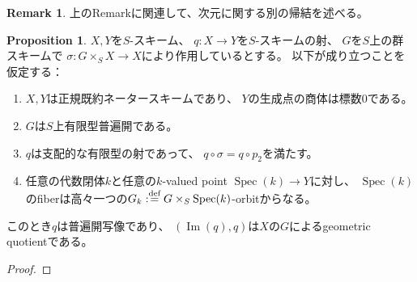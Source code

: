 \documentclass[uplatex]{jsarticle}
\theoremstyle{definition}
\newtheorem{prop}[prop]{Proposition}
\newtheorem*{rem*}{Remark}
\DeclareMathOperator{\im}{\mathrm{Im}}
\DeclareMathOperator{\Spec}{\mathrm{Spec}}
\newcommand{\dfn}{:\overset{\mbox{{\scriptsize def}}}{=}}
\begin{document}
\begin{rem*}
  上のRemarkに関連して、次元に関する別の帰結を述べる。
\end{rem*}

\begin{prop}
  \(X,Y\)を\(S\)-スキーム、
  \(q:X\to Y\)を\(S\)-スキームの射、
  \(G\)を\(S\)上の群スキームで
  \(\sigma:G\times_S X \to X\)により作用しているとする。
  以下が成り立つことを仮定する：
  \begin{enumerate}
    \item \(X,Y\)は正規既約ネータースキームであり、
    \(Y\)の生成点の商体は標数\(0\)である。
    \item \(G\)は\(S\)上有限型普遍開である。
    \item \(q\)は支配的な有限型の射であって、
    \(q\circ \sigma = q\circ p_2\)を満たす。
    \item 任意の代数閉体\(k\)と任意の\(k\)-valued point \(\Spec(k)\to Y\)に対し、
    \(\Spec(k)\)のfiberは高々一つの\(G_k\dfn G\times_S \Spec(k)\)-orbitからなる。
  \end{enumerate}
  このとき\(q\)は普遍開写像であり、
  \((\im(q),q)\)は\(X\)の\(G\)によるgeometric quotientである。
\end{prop}


\begin{proof}

\end{proof}
\end{document}

